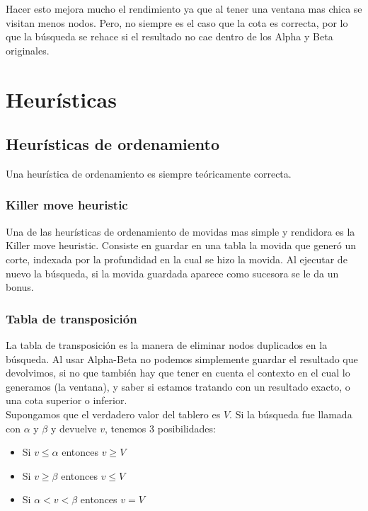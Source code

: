 \documentclass{article}
\begin{document}
Hacer esto mejora mucho el rendimiento ya que al tener una ventana mas
chica se visitan menos nodos. Pero, no siempre es el caso que la cota
es correcta, por lo que la búsqueda se rehace si el resultado no cae
dentro de los Alpha y Beta originales.

\section{Heurísticas}

\subsection{Heurísticas de ordenamiento}

Una heurística de ordenamiento es siempre teóricamente correcta.

\subsubsection{Killer move heuristic}
Una de las heurísticas de ordenamiento de movidas mas simple y
rendidora es la Killer move heuristic. Consiste en guardar en una tabla
la movida que generó un corte, indexada por la profundidad en la cual
se hizo la movida. Al ejecutar de nuevo la búsqueda, si la movida
guardada aparece como sucesora se le da un bonus.
\\

\subsubsection{Tabla de transposición}
La tabla de transposición es la manera de eliminar nodos duplicados
en la búsqueda. Al usar Alpha-Beta no podemos simplemente guardar el
resultado que devolvimos, si no que también hay que tener en cuenta
el contexto en el cual lo generamos (la ventana), y saber si estamos
tratando con un resultado exacto, o una cota superior o inferior.
\\

Supongamos que el verdadero valor del tablero es $V$. Si la búsqueda
fue llamada con $\alpha$ y $\beta$ y devuelve $v$, tenemos 3
posibilidades:

\begin{itemize}
\item Si $v \le \alpha$ entonces $v \ge V$
\item Si $v \ge \beta$ entonces $v \le V$
\item Si $\alpha < v < \beta$ entonces $v = V$
\end{itemize}
\end{document}
